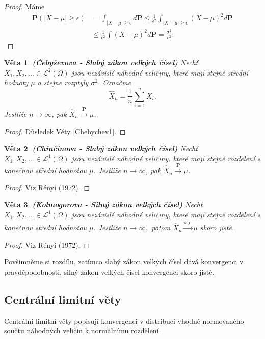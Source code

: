 \documentclass[a4]{report}
\newtheorem{theorem}{Věta}
\theoremstyle{definition}
\begin{document}
{\begin{proof}
Máme
\begin{align*}
\textbf{P}(|X - \mu | \geq \epsilon) &= \int_{|X - \mu | \geq \epsilon} d\textbf{P} \leq \frac{1}{\epsilon^{2}}\int_{|X - \mu | \geq \epsilon} (X - \mu)^{2}d\textbf{P} \\
&\leq \frac{1}{\epsilon^{2}} \int (X - \mu)^{2}d\textbf{P} = \frac{\sigma^{2}}{\epsilon^{2}}.
\end{align*}
\end{proof}

\begin{theorem}{\textbf{(Čebyševova - Slabý zákon velkých čísel)}}
Nechť $X_{1}, X_{2}, ... \in \mathcal{L}^{2}(\Omega)$ jsou nezávislé náhodné veličiny, které mají stejné střední hodnoty $\mu$ a stejne rozptyly $\sigma^{2}$. Označme
\begin{equation}
\hat{X}_{n} = \frac{1}{n}\sum_{i = 1}^{n} X_{i}.
\end{equation}
Jestliže $n \longrightarrow \infty$, pak $\hat{X}_{n} \xrightarrow{\mathbf{P}} \mu$.
\end{theorem}
\begin{proof}
Důsledek Věty \ref{Chebychev1}.
\end{proof}

\begin{theorem}{\textbf{(Chinčinova - Slabý zákon velkých čísel)}}
Nechť $X_{1}, X_{2}, ... \in \mathcal{L}^{1}(\Omega)$ jsou nezávislé náhodné veličiny, které mají stejné rozdělení s konečnou střední hodnotou $\mu$. Jestliže $n \longrightarrow \infty$, pak $\hat{X}_{n} \xrightarrow{\mathbf{P}} \mu$.
\end{theorem}
\begin{proof}
Viz Rényi (1972).
\end{proof}

\begin{theorem}{\textbf{(Kolmogorova - Silný zákon velkých čísel)}}
Nechť $X_{1}, X_{2}, ... \in \mathcal{L}^{1}(\Omega)$ jsou nezávislé náhodné veličiny, které mají stejné rozdělení s konečnou střední hodnotou $\mu$. Jestliže $n \longrightarrow \infty,$ potom $\hat{X}_{n} \xrightarrow{s.j.} \mu$ skoro jistě.
\end{theorem}
\begin{proof}
Viz Rényi (1972).
\end{proof}
Povšimněme si rozdílu, zatímco slabý zákon velkých čísel dává konvergenci v pravděpodobnosti, silný zákon velkých čísel konvergenci skoro jistě.

\subsection{Centrální limitní věty}
Centrální limitní věty popisují konvergenci v distribuci vhodně normovaného součtu náhodných veličin k normálnímu rozdělení.

}
\end{document}
